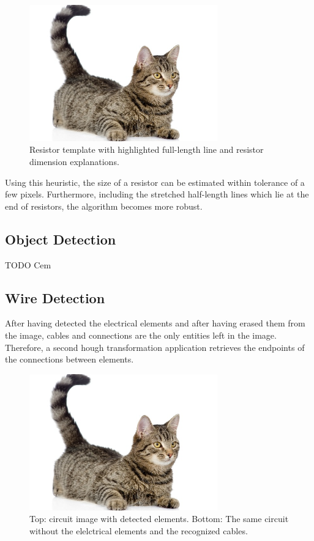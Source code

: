 \documentclass[10pt,twocolumn,letterpaper]{article}
\begin{document}
\begin{figure}[!ht]
\includegraphics[width = 3.2in]{img/cat.jpg}
\caption{Resistor template with highlighted full-length line and resistor dimension explanations.}
\label{fig:c9}
\end{figure}

\par
Using this heuristic, the size of a resistor can be estimated within tolerance of a few pixels. Furthermore, including the stretched half-length lines which lie at the end of resistors, the algorithm becomes more robust.

\subsection{Object Detection}
\label{subsec:obj}

TODO Cem

\subsection{Wire Detection}
\label{subsec:wire}

After having detected the electrical elements and after having erased them from the image, cables and connections are the only entities left in the image. Therefore, a second hough transformation application retrieves the endpoints of the connections between elements.
\par

\begin{figure}[!ht]
\includegraphics[width = 3.2in]{img/cat.jpg}
\caption{Top: circuit image with detected elements. Bottom: The same circuit without the elelctrical elements and the recognized cables.}
\label{fig:c10}
\end{figure}
\end{document}
